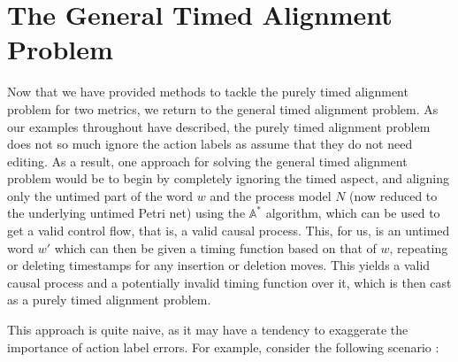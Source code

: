 \documentclass[conference]{IEEEtran}
\begin{document}
\section{The General Timed Alignment Problem} \label{align}

Now that we have provided methods to tackle the purely timed alignment problem for two metrics, we return to the general timed alignment problem. As our examples throughout have described, the purely timed alignment problem does not so much ignore the action labels as assume that they do  not need editing. 
As a result, one approach for solving the general timed alignment problem would be to begin by completely ignoring the timed aspect, and aligning only the untimed part of the word $w$ and the process model $N$ (now reduced to the underlying untimed Petri net) using the $\mathbb{A}^*$ algorithm\cite{Adriansyah2014AligningOA}, which can be used to get a valid control flow, that is, a valid causal process. This, for us, is an untimed word $w'$ which can then be given a timing function based on that of $w$, %
repeating or deleting timestamps for any insertion or deletion moves. This yields a valid causal process and a potentially invalid timing function over it, which is then cast as a purely timed alignment problem. 

This approach is quite naive, as it may have a tendency to exaggerate the importance of action label errors. For example, consider the following scenario : 
\end{document}
